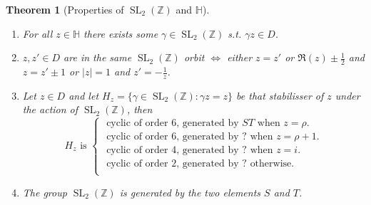 \documentclass{article}
\newtheorem*{thm}{Theorem}
\theoremstyle{definition}
\DeclareMathOperator{\SL}{SL}
\begin{document}
\begin{thm}[Properties of $\SL_2(\mathbb{Z})$ and $\mathbb{H}$]~
\begin{enumerate}
\item For all $z\in \mathbb{H}$ there exists some $\gamma \in \SL_2(\mathbb{Z})$ s.t. $\gamma z\in D$.
\item $z,z'\in D$ are in the same $\SL_2(\mathbb{Z})$ orbit $\iff$ either $z=z'$ or $\Re(z) \pm\frac{1}{2}$ and $z= z' \pm 1$ or $|z|=1$ and $z' = -\frac 1 z$.
\item Let $z\in D$ and let $H_z = \{\gamma \in \SL_2(\mathbb{Z}) \colon \gamma z=z\}$ be that stabilisser of $z$ under the action of $\SL_2(\mathbb{Z})$, then 
\[
H_z \text{ is } \begin{cases} %
\text{ cyclic of order 6, generated by } ST \text{ when } z = \rho. \\
\text{ cyclic of order 6, generated by } ? \text{ when } z = \rho + 1. \\
\text{ cyclic of order 4, generated by } ? \text{ when } z = i. \\
\text{ cyclic of order 2, generated by } ? \text{ otherwise.}\\
\end{cases}
\]

\item The group $\SL_2(\mathbb{Z})$ is generated by the two elements $S$ and $T$.
\end{enumerate}
\end{thm}
\end{document}
